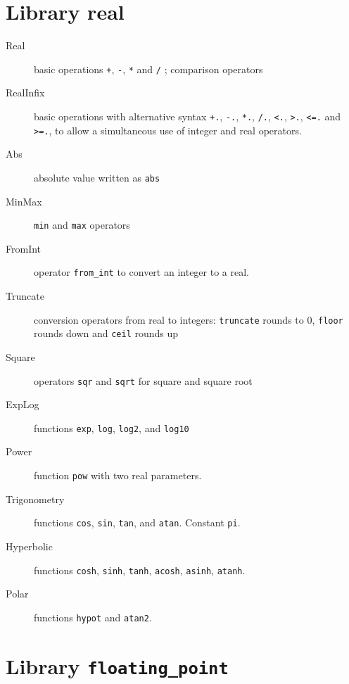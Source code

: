 \section{Library real}

\begin{description}

\item[Real] basic operations \verb|+|, \verb|-|, \verb|*| and \verb|/| ;
  comparison operators

\item[RealInfix] basic operations with alternative syntax \verb|+.|,
  \verb|-.|, \verb|*.|, \verb|/.|, \verb|<.|, \verb|>.|, \verb|<=.| and \verb|>=.|, to
  allow a simultaneous use of integer and real operators.

\item[Abs] absolute value written as \verb|abs|

\item[MinMax] \verb|min| and \verb|max| operators

\item[FromInt] operator \verb|from_int| to convert an integer to a real.

\item[Truncate] conversion operators from real to integers:
  \verb|truncate| rounds to 0, \verb|floor| rounds down and
  \verb|ceil| rounds up

\item[Square] operators \verb|sqr| and \verb|sqrt| for square and square root

\item[ExpLog] functions \verb|exp|, \verb|log|, \verb|log2|, and \verb|log10|

\item[Power] function \verb|pow| with two real parameters.

\item[Trigonometry] functions \verb|cos|, \verb|sin|, \verb|tan|, and
  \verb|atan|. Constant \verb|pi|.

\item[Hyperbolic] functions \verb|cosh|, \verb|sinh|, \verb|tanh|,
  \verb|acosh|, \verb|asinh|, \verb|atanh|.

\item[Polar] functions \verb|hypot| and \verb|atan2|.

\end{description}

\section{Library \texttt{floating\_point}}

